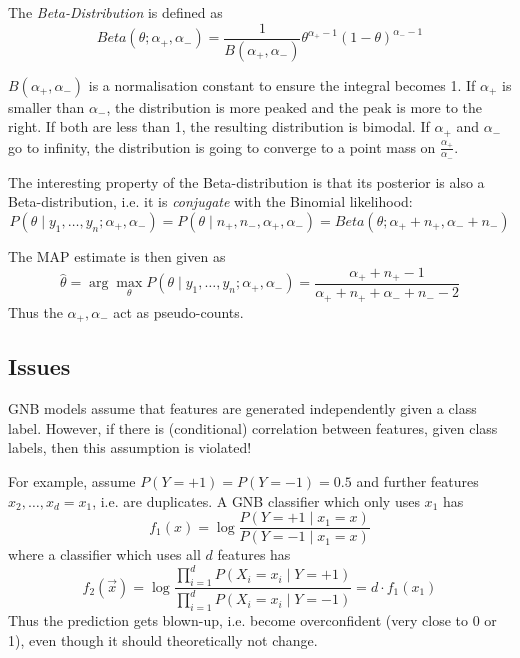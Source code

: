 The \emph{Beta-Distribution} is defined as
\begin{equation*}
    Beta(\theta; \alpha_+, \alpha_-) =
    \frac{1}{B(\alpha_+, \alpha_-)}
    \theta^{\alpha_+ - 1}
    (1 - \theta)^{\alpha_- - 1}
\end{equation*}

$B(\alpha_+, \alpha_-)$ is
a normalisation constant to
ensure the integral becomes 1.
If $\alpha_+$ is smaller than $\alpha_-$,
the distribution is more peaked and the
peak is more to the right.
If both are less than 1,
the resulting distribution is bimodal.
If $\alpha_+$ and $\alpha_-$ go to infinity,
the distribution is going to converge to a point mass
on $\frac{\alpha_+}{\alpha_-}$.

The interesting property of the Beta-distribution
is that its posterior
is also a Beta-distribution,
i.e. it is \emph{conjugate} with the Binomial likelihood:
\begin{equation*}
    P(\theta \mid y_1, \dotsc, y_n; \alpha_+, \alpha_-)
    = P(\theta \mid n_+, n_-, \alpha_+, \alpha_-)
    = Beta(\theta; \alpha_+ + n_+, \alpha_- + n_-)
\end{equation*}

The MAP estimate is then given as
\begin{equation*}
    \hat{\theta} = \arg\max_{\theta}{P(\theta \mid y_1, \dotsc, y_n; \alpha_+, \alpha_-)}
    = \frac{\alpha_+ + n_+ - 1}{\alpha_+ + n_+ + \alpha_- + n_- - 2}
\end{equation*}
Thus the $\alpha_+, \alpha_-$ act as pseudo-counts.


\subsection{Issues}
GNB models assume that features are generated
independently given a class label.
However, if there is (conditional)
correlation between features, given class labels,
then this assumption is violated!

For example,
assume $P(Y = +1) = P(Y = -1) = 0.5$ and
further features
$x_2, \dotsc, x_d = x_1$,
i.e. are duplicates.
A GNB classifier which only uses $x_1$
has
\begin{equation*}
    f_1(x) = \log{
        \frac{P(Y = +1 \mid x_1 = x)}
        {P(Y = -1 \mid x_1 = x)}
    }
\end{equation*}
where a classifier which uses all $d$
features has
\begin{equation*}
    f_2(\vec{x}) = \log{
    \frac
    {\prod_{i=1}^d{P(X_i = x_i \mid Y = +1)}}
    {\prod_{i=1}^d{P(X_i = x_i \mid Y = -1)}}
    }
    = d \cdot f_1(x_1)
\end{equation*}
Thus the prediction gets blown-up,
i.e. become overconfident
(very close to 0 or 1),
even though it should theoretically not change.

